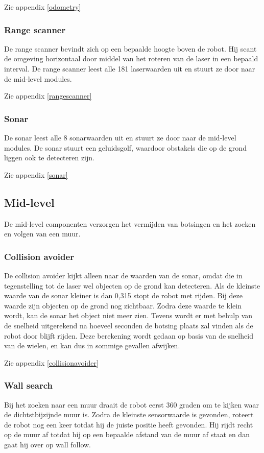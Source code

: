 \documentclass[a4paper,10pt]{article}
\begin{document}
Zie appendix \ref{odometry}

\subsubsection{Range scanner}
De range scanner bevindt zich op een bepaalde hoogte boven de robot. Hij scant de omgeving horizontaal door middel van het roteren van de laser in een bepaald interval. De range scanner leest alle 181 laserwaarden uit en stuurt ze door naar de mid-level modules.

Zie appendix \ref{rangescanner}

\subsubsection{Sonar}
De sonar leest alle 8 sonarwaarden uit en stuurt ze door naar de mid-level modules. De sonar stuurt een geluidsgolf, waardoor obstakels die op de grond liggen ook te detecteren zijn.

Zie appendix \ref{sonar}

\subsection{Mid-level}
De mid-level componenten verzorgen het vermijden van botsingen en het zoeken en volgen van een muur.

\subsubsection{Collision avoider}
De collision avoider kijkt alleen naar de waarden van de sonar, omdat die in tegenstelling tot de laser wel objecten op de grond kan detecteren. Als de kleinste waarde van de sonar kleiner is dan 0,315 stopt de robot met rijden. Bij deze waarde zijn objecten op de grond nog zichtbaar. Zodra deze waarde te klein wordt, kan de sonar het object niet meer zien. Tevens wordt er met behulp van de snelheid uitgerekend na hoeveel seconden de botsing plaats zal vinden als de robot door blijft rijden. Deze berekening wordt gedaan op basis van de snelheid van de wielen, en kan dus in sommige gevallen afwijken.

Zie appendix \ref{collisionavoider}

\subsubsection{Wall search}
Bij het zoeken naar een muur draait de robot eerst 360 graden om te kijken waar de dichtstbijzijnde muur is. Zodra de kleinste sensorwaarde is gevonden, roteert de robot nog een keer totdat hij de juiste positie heeft gevonden. Hij rijdt recht op de muur af totdat hij op een bepaalde afstand van de muur af staat en dan gaat hij over op wall follow.
\end{document}
